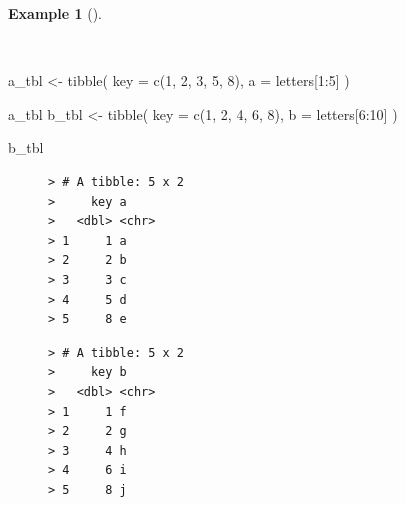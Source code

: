\documentclass[
  letterpaper,
  DIV=11,
  numbers=noendperiod]{scrreprt}
\newenvironment{Shaded}{\begin{snugshade}}{\end{snugshade}}
\newcommand{\AttributeTok}[1]{\textcolor[rgb]{0.00,0.00,0.00}{#1}}
\newcommand{\DecValTok}[1]{\textcolor[rgb]{0.00,0.00,0.00}{#1}}
\newcommand{\FunctionTok}[1]{\textcolor[rgb]{0.00,0.00,0.00}{#1}}
\newcommand{\NormalTok}[1]{\textcolor[rgb]{0.00,0.00,0.00}{#1}}
\newcommand{\OtherTok}[1]{\textcolor[rgb]{0.00,0.00,0.00}{#1}}
\newcommand{\SpecialCharTok}[1]{\textcolor[rgb]{0.00,0.00,0.00}{#1}}
\theoremstyle{definition}
\newtheorem{example}{Example}[chapter]
\theoremstyle{remark}
\begin{document}
\begin{example}[]\protect\hypertarget{exm-td-merging-join-dfs}{}\label{exm-td-merging-join-dfs}

~

\begin{Shaded}
\begin{Highlighting}[]
\NormalTok{a\_tbl }\OtherTok{\textless{}{-}}
  \FunctionTok{tibble}\NormalTok{(}
    \AttributeTok{key =} \FunctionTok{c}\NormalTok{(}\DecValTok{1}\NormalTok{, }\DecValTok{2}\NormalTok{, }\DecValTok{3}\NormalTok{, }\DecValTok{5}\NormalTok{, }\DecValTok{8}\NormalTok{),}
    \AttributeTok{a =}\NormalTok{ letters[}\DecValTok{1}\SpecialCharTok{:}\DecValTok{5}\NormalTok{]}
\NormalTok{  )}

\NormalTok{a\_tbl}
\NormalTok{b\_tbl }\OtherTok{\textless{}{-}}
  \FunctionTok{tibble}\NormalTok{(}
    \AttributeTok{key =} \FunctionTok{c}\NormalTok{(}\DecValTok{1}\NormalTok{, }\DecValTok{2}\NormalTok{, }\DecValTok{4}\NormalTok{, }\DecValTok{6}\NormalTok{, }\DecValTok{8}\NormalTok{),}
    \AttributeTok{b =}\NormalTok{ letters[}\DecValTok{6}\SpecialCharTok{:}\DecValTok{10}\NormalTok{]}
\NormalTok{  )}

\NormalTok{b\_tbl}
\end{Highlighting}
\end{Shaded}

\begin{figure}

\begin{minipage}{0.50\linewidth}

\begin{verbatim}
> # A tibble: 5 x 2
>     key a    
>   <dbl> <chr>
> 1     1 a    
> 2     2 b    
> 3     3 c    
> 4     5 d    
> 5     8 e
\end{verbatim}

\end{minipage}%
%
\begin{minipage}{0.50\linewidth}

\begin{verbatim}
> # A tibble: 5 x 2
>     key b    
>   <dbl> <chr>
> 1     1 f    
> 2     2 g    
> 3     4 h    
> 4     6 i    
> 5     8 j
\end{verbatim}

\end{minipage}%

\end{figure}%

\end{example}
\end{document}
